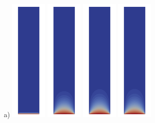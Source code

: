 \begin{center}
a)
\includegraphics[width=1.8cm]{images/benchmark_lapplate/temper0000.png}
\includegraphics[width=1.8cm]{images/benchmark_lapplate/temper0010.png}
\includegraphics[width=1.8cm]{images/benchmark_lapplate/temper0020.png}
\includegraphics[width=1.8cm]{images/benchmark_lapplate/temper0030.png}

\end{center}

